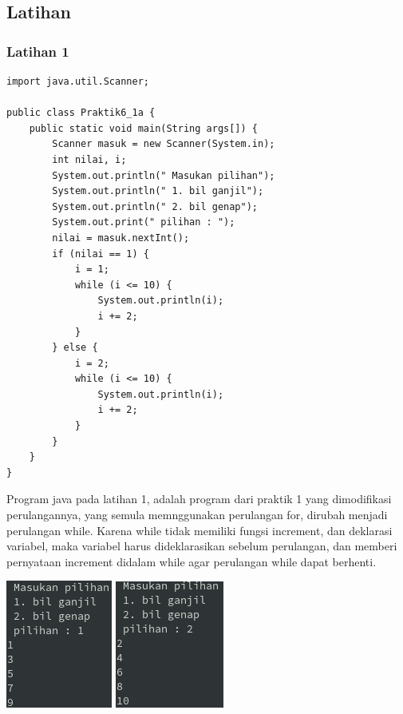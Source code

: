 \documentclass[a4paper,12pt]{article}
\begin{document}
\subsection{Latihan}
\subsubsection{Latihan 1}
\begin{lstlisting}
import java.util.Scanner;

public class Praktik6_1a {
    public static void main(String args[]) {
        Scanner masuk = new Scanner(System.in);
        int nilai, i;
        System.out.println(" Masukan pilihan");
        System.out.println(" 1. bil ganjil");
        System.out.println(" 2. bil genap");
        System.out.print(" pilihan : ");
        nilai = masuk.nextInt();
        if (nilai == 1) {
            i = 1;
            while (i <= 10) {
                System.out.println(i);
                i += 2;
            }
        } else {
            i = 2;
            while (i <= 10) {
                System.out.println(i);
                i += 2;
            }
        }
    }
}
\end{lstlisting}
Program java pada latihan 1, adalah program dari praktik 1 yang dimodifikasi perulangannya, yang semula memnggunakan perulangan for, dirubah menjadi perulangan while. Karena while tidak
memiliki fungsi increment, dan deklarasi variabel, maka variabel harus dideklarasikan sebelum perulangan, dan memberi pernyataan increment didalam while agar perulangan while dapat
berhenti.
\begin{center}
    \includegraphics[scale=.8]{1.png}
    \includegraphics[scale=.8]{2.png}
\end{center}
\end{document}
